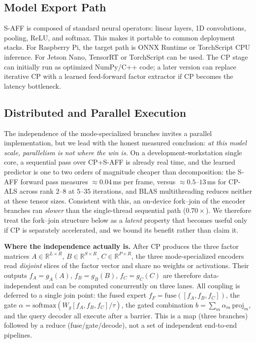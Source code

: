 \documentclass[10pt,conference]{IEEEtran}
\begin{document}
\subsection{Model Export Path}

S-AFF is composed of standard neural operators: linear layers, 1D convolutions, pooling, ReLU, and softmax. This makes it portable to common deployment stacks. For Raspberry Pi, the target path is ONNX Runtime or TorchScript CPU inference. For Jetson Nano, TensorRT or TorchScript can be used. The CP stage can initially run as optimized NumPy/C++ code; a later version can replace iterative CP with a learned feed-forward factor extractor if CP becomes the latency bottleneck.

\subsection{Distributed and Parallel Execution}
\label{sec:parallel}

The independence of the mode-specialized branches invites a parallel implementation, but we lead with the honest measured conclusion: \emph{at this model scale, parallelism is not where the win is.} On a development-workstation single core, a sequential pass over CP+S-AFF is already real time, and the learned predictor is one to two orders of magnitude cheaper than decomposition: the S-AFF forward pass measures $\approx0.04$\,ms per frame, versus $\approx0.5$--$13$\,ms for CP-ALS across rank $2$--$8$ at $5$--$35$ iterations, and BLAS multithreading reduces neither at these tensor sizes. Consistent with this, an on-device fork--join of the encoder branches ran \emph{slower} than the single-thread sequential path ($0.70\times$). We therefore treat the fork--join structure below as a \emph{latent} property that becomes useful only if CP is separately accelerated, and we bound its benefit rather than claim it.

\textbf{Where the independence actually is.}
After CP produces the three factor matrices $A\in\mathbb{R}^{L\times R}$, $B\in\mathbb{R}^{S\times R}$, $C\in\mathbb{R}^{P\times R}$, the three mode-specialized encoders read \emph{disjoint} slices of the factor vector and share no weights or activations. Their outputs $f_A=g_A(A)$, $f_B=g_B(B)$, $f_C=g_C(C)$ are therefore data-independent and can be computed concurrently on three lanes. All coupling is deferred to a single join point: the fused expert $f_F=\mathrm{fuse}([f_A,f_B,f_C])$, the gate $\alpha=\mathrm{softmax}(W_g[f_A,f_B,f_C]/\tau)$, the gated combination $b=\sum_m \alpha_m\, \mathrm{proj}_m$, and the query decoder all execute after a barrier. This is a map (three branches) followed by a reduce (fuse/gate/decode), not a set of independent end-to-end pipelines.
\end{document}
